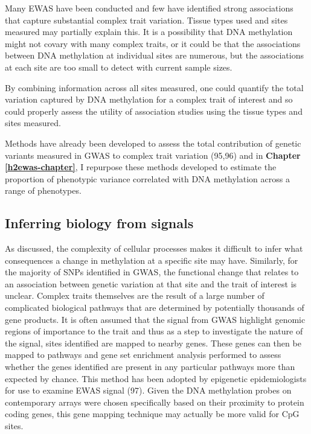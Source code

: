 \documentclass[11pt,oneside]{bristolthesis}
\begin{document}
Many EWAS have been conducted and few have identified strong associations that capture substantial complex trait variation. Tissue types used and sites measured may partially explain this. It is a possibility that DNA methylation might not covary with many complex traits, or it could be that the associations between DNA methylation at individual sites are numerous, but the associations at each site are too small to detect with current sample sizes.

By combining information across all sites measured, one could quantify the total variation captured by DNA methylation for a complex trait of interest and so could properly assess the utility of association studies using the tissue types and sites measured.

Methods have already been developed to assess the total contribution of genetic variants measured in GWAS to complex trait variation (95,96) and in \textbf{Chapter \ref{h2ewas-chapter}}, I repurpose these methods developed to estimate the proportion of phenotypic variance correlated with DNA methylation across a range of phenotypes.

\hypertarget{inferring-biology-from-signals}{%
\subsection{Inferring biology from signals}\label{inferring-biology-from-signals}}

As discussed, the complexity of cellular processes makes it difficult to infer what consequences a change in methylation at a specific site may have. Similarly, for the majority of SNPs identified in GWAS, the functional change that relates to an association between genetic variation at that site and the trait of interest is unclear. Complex traits themselves are the result of a large number of complicated biological pathways that are determined by potentially thousands of gene products. It is often assumed that the signal from GWAS highlight genomic regions of importance to the trait and thus as a step to investigate the nature of the signal, sites identified are mapped to nearby genes. These genes can then be mapped to pathways and gene set enrichment analysis performed to assess whether the genes identified are present in any particular pathways more than expected by chance. This method has been adopted by epigenetic epidemiologists for use to examine EWAS signal (97). Given the DNA methylation probes on contemporary arrays were chosen specifically based on their proximity to protein coding genes, this gene mapping technique may actually be more valid for CpG sites.
\end{document}

